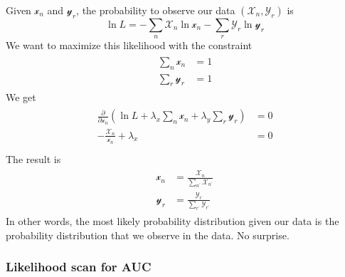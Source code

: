 \documentclass[11pt]{article}
\begin{document}
Given \(\mathscr{x}_n\) and \(\mathscr{y}_r\), the probability to observe our data \((\mathscr{X}_n, \mathscr{Y}_r)\) is
\begin{equation}
\ln{L}=-\sum_{n}\mathscr{X}_n\ln{\mathscr{x}_n}-\sum_{r}\mathscr{Y}_r\ln{\mathscr{y}_r}
\label{eq:discrete_loglikelihood}
\end{equation}
We want to maximize this likelihood with the constraint
\begin{align}
\begin{aligned}
\sum_n{\mathscr{x}_n}&=1 \\
\sum_r{\mathscr{y}_r}&=1
\end{aligned}
\label{eq:discrete_normalization}
\end{align}
We get
\begin{align}
\begin{aligned}
\frac{\partial}{\partial \mathscr{x}_n}(\ln{L} + \lambda_x \sum_n {\mathscr{x}_n} + \lambda_y \sum_r{\mathscr{y}_r})&=0 \\
-\frac{\mathscr{X}_n}{\mathscr{x}_n}+\lambda_x&=0 \\
\end{aligned}
\end{align}
The result is
\begin{align}
\begin{aligned}
\mathscr{x}_n&=\frac{\mathscr{X}_n}{\sum_{n^\prime}\mathscr{X}_{n^\prime}} \\
\mathscr{y}_r&=\frac{\mathscr{Y}_r}{\sum_{r^\prime}\mathscr{Y}_{r^\prime}}
\end{aligned}
\end{align}
In other words, the most likely probability distribution given our data is the probability distribution that we observe in the data.  No surprise.

\subsubsection{Likelihood scan for AUC}\label{sec:discrete_likelihood_scan}
\end{document}

